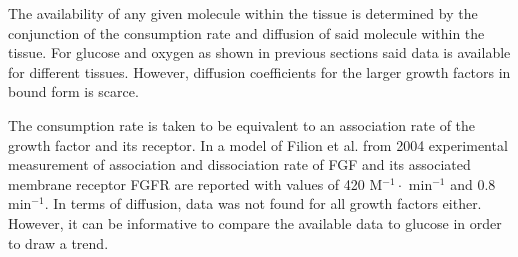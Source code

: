 \documentclass[11pt,a4paper]{article}
\begin{document}
The availability of any given molecule within the tissue is determined by the conjunction of the consumption rate and diffusion of said molecule within the tissue. For glucose and oxygen as shown in previous sections said data is available for different tissues. However, diffusion coefficients for the larger growth factors in bound form is scarce. 

The consumption rate is taken to be equivalent to an association rate of the growth factor and its receptor. In a model of Filion et al. from 2004 experimental measurement of association and dissociation rate of FGF and its associated membrane receptor FGFR are reported with values of 420 \textmu M$^{-1} \cdot $ min$^{-1}$ and 0.8 min$^{-1}$. In terms of diffusion, data was not found for all growth factors either. However, it can be informative to compare the available data to glucose in order  to draw a trend.
\end{document}
